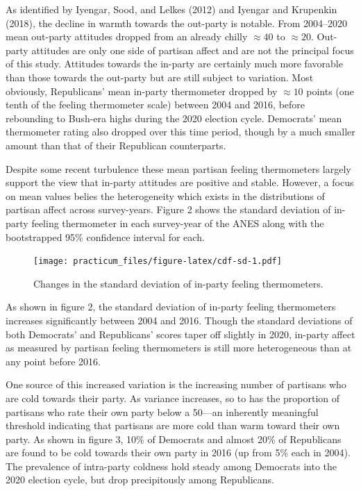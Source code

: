 \documentclass[
]{article}
\begin{document}
As identified by Iyengar, Sood, and Lelkes (2012) and Iyengar and Krupenkin (2018), the decline in warmth towards the out-party is notable. From 2004--2020 mean out-party attitudes dropped from an already chilly \(\approx{40}\) to \(\approx 20\). Out-party attitudes are only one side of partisan affect and are not the principal focus of this study. Attitudes towards the in-party are certainly much more favorable than those towards the out-party but are still subject to variation. Most obviously, Republicans' mean in-party thermometer dropped by \(\approx{10}\) points (one tenth of the feeling thermometer scale) between 2004 and 2016, before rebounding to Bush-era highs during the 2020 election cycle. Democrats' mean thermometer rating also dropped over this time period, though by a much smaller amount than that of their Republican counterparts.

Despite some recent turbulence these mean partisan feeling thermometers largely support the view that in-party attitudes are positive and stable. However, a focus on mean values belies the heterogeneity which exists in the distributions of partisan affect across survey-years. Figure 2 shows the standard deviation of in-party feeling thermometer in each survey-year of the ANES along with the bootstrapped 95\% confidence interval for each.

\begin{figure}
\centering
\texttt{[image: practicum\_files/figure-latex/cdf-sd-1.pdf]}
\caption{\label{fig:cdf-sd}Changes in the standard deviation of in-party feeling thermometers.}
\end{figure}

As shown in figure 2, the standard deviation of in-party feeling thermometers increases significantly between 2004 and 2016. Though the standard deviations of both Democrats' and Republicans' scores taper off slightly in 2020, in-party affect as measured by partisan feeling thermometers is still more heterogeneous than at any point before 2016.

One source of this increased variation is the increasing number of partisans who are cold towards their party. As variance increases, so to has the proportion of partisans who rate their own party below a 50---an inherently meaningful threshold indicating that partisans are more cold than warm toward their own party. As shown in figure 3, 10\% of Democrats and almost 20\% of Republicans are found to be cold towards their own party in 2016 (up from 5\% each in 2004). The prevalence of intra-party coldness hold steady among Democrats into the 2020 election cycle, but drop precipitously among Republicans.
\end{document}

